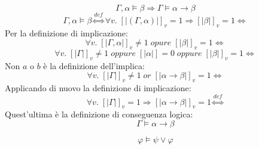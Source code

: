 \documentclass{article}
\theoremstyle{break}
\theoremstyle{break}
\theoremstyle{break}
\theoremstyle{break}
\begin{document}
\begin{exercise}[a casa]
	\[
		\Gamma,\alpha \models \beta \Rightarrow \Gamma \models \alpha \to \beta
	\]
    \[
        \Gamma,\alpha \models \beta \stackrel{def}{\Leftrightarrow} \forall v.\; [|(\Gamma,\alpha)|]_v=1 \Rightarrow [|\beta|]_v=1 \Leftrightarrow
    \]
    Per la definizione di implicazione:
    \[
        \forall v.\; [|\Gamma,\alpha|]_v \neq 1\; opure\; [|\beta|]_v=1 \Leftrightarrow
    \] 
    \[
        \forall v.\; [|\Gamma|]_v \neq 1\; oppure\; [|\alpha|] = 0\; oppure\; [|\beta|]_v=1 \Leftrightarrow
    \] 
    Non \( a \) o \( b \) è la definizione dell'implica:
    \[
        \forall v.\; [|\Gamma|]_v \neq 1\; or\; [|\alpha \to \beta|]_v=1 \Leftrightarrow
    \] 
    Applicando di nuovo la definizione di implicazione:
    \[
        \forall v.\; [|\Gamma|]_v=1 \Rightarrow [|\alpha \to \beta|]_v=1 \stackrel{def}{\Leftrightarrow}
    \] 
    Quest'ultima è la definizione di conseguenza logica:
    \[
    \Gamma \models \alpha \to \beta
    \] 
\end{exercise}
\begin{exercise}[a casa]
	\[
		\varphi \models \psi \vee \varphi
	\]
\end{exercise}
\end{document}
